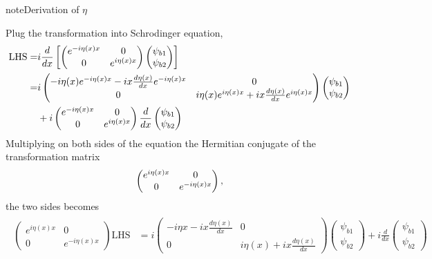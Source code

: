 \documentclass[letterpaper,12pt,english]{sphinxmanual}
\begin{document}
\begin{notice}{note}{Derivation of \(\eta\)}

Plug the transformation into Schrodinger equation,
\begin{gather}
\begin{split}\mathrm{LHS} =& i \frac{d}{dx} \left[  \begin{pmatrix} e^{-i\eta(x) x} & 0 \\  0 & e^{i\eta(x) x} \end{pmatrix}  \begin{pmatrix} \psi_{b1} \\ \psi_{b2} \end{pmatrix} \right] \\
=& i \begin{pmatrix}  - i \eta(x) e^{-i \eta(x) x} - i x \frac{d\eta(x)}{dx} e^{-i \eta(x) x}  & 0 \\  0 & i\eta(x) e^{i\eta(x) x} + i x \frac{d\eta(x)}{dx} e^{i\eta(x)x}  \end{pmatrix}  \begin{pmatrix} \psi_{b1} \\ \psi_{b2} \end{pmatrix}  \\
& +  i \begin{pmatrix} e^{-i\eta(x) x} & 0 \\  0 & e^{i\eta(x) x}  \end{pmatrix} \frac{d}{dx} \begin{pmatrix} \psi_{b1} \\ \psi_{b2} \end{pmatrix}\end{split}\notag
\end{gather}
Multiplying on both sides of the equation the Hermitian conjugate of the transformation matrix
\begin{gather}
\begin{split}\begin{pmatrix} e^{i\eta(x)x} & 0 \\ 0 & e^{-i \eta(x)x} \end{pmatrix},\end{split}\notag
\end{gather}
the two sides becomes
\begin{gather}
\begin{split}\begin{pmatrix} e^{i\eta(x)x} & 0 \\ 0 & e^{-i \eta(x)x} \end{pmatrix}\mathrm{LHS} & = i \begin{pmatrix} - i\eta{x} - i x \frac{d\eta(x)}{dx} &  0 \\ 0 & i \eta(x) + i x \frac{d\eta(x)}{dx} \end{pmatrix}  \begin{pmatrix} \psi_{b1} \\ \psi_{b2} \end{pmatrix} + i \frac{d}{dx} \begin{pmatrix} \psi_{b1} \\ \psi_{b2} \end{pmatrix}  \\

\end{split}
\end{gather}
\end{notice}
\end{document}
